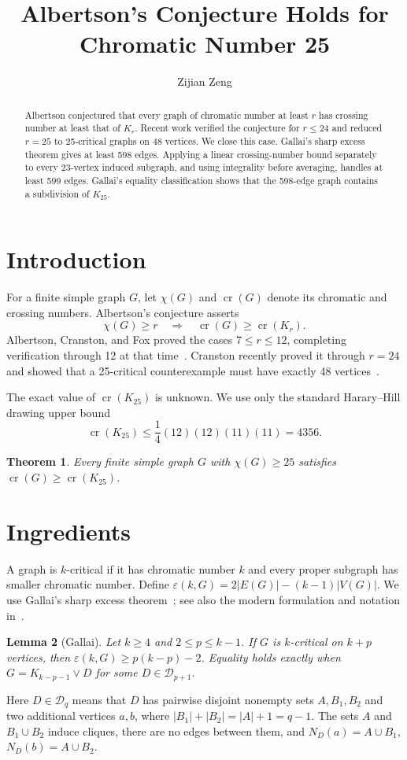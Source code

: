 \documentclass[11pt]{amsart}
\title{Albertson's Conjecture Holds for Chromatic Number 25}
\author{Zijian Zeng}
\date{}
\newtheorem{theorem}{Theorem}[section]
\newtheorem{lemma}[theorem]{Lemma}
\newcommand{\crn}{\operatorname{cr}}
\newcommand{\join}{\mathbin{\vee}}
\begin{document}
\begin{abstract}
Albertson conjectured that every graph of chromatic number at least $r$ has
crossing number at least that of $K_r$. Recent work verified the conjecture
for $r\leq24$ and reduced $r=25$ to 25-critical graphs on 48 vertices. We
close this case. Gallai's sharp excess theorem gives at least 598 edges.
Applying a linear crossing-number bound separately to every 23-vertex induced
subgraph, and using integrality before averaging, handles at least 599 edges.
Gallai's equality classification shows that the 598-edge graph contains a
subdivision of $K_{25}$.
\end{abstract}
\maketitle

\section{Introduction}
For a finite simple graph $G$, let $\chi(G)$ and $\crn(G)$ denote its chromatic
and crossing numbers. Albertson's conjecture asserts
\[
 \chi(G)\geq r\quad\Longrightarrow\quad\crn(G)\geq\crn(K_r).
\]
Albertson, Cranston, and Fox proved the cases $7\leq r\leq12$, completing
verification through 12 at that time~\cite{Albertson_Cranston_Fox_2009}.
Cranston recently proved it
through $r=24$ and showed that a 25-critical counterexample must have exactly
48 vertices~\cite{cranston2025progressalbertsonsconjecture}.

The exact value of $\crn(K_{25})$ is unknown. We use only the standard
Harary--Hill drawing upper bound
\begin{equation}\label{eq:hill}
 \crn(K_{25})\leq\frac14(12)(12)(11)(11)=4356.
\end{equation}
\begin{theorem}\label{thm:main}
Every finite simple graph $G$ with $\chi(G)\geq25$ satisfies
$\crn(G)\geq\crn(K_{25})$.
\end{theorem}

\section{Ingredients}
A graph is $k$-critical if it has chromatic number $k$ and every proper
subgraph has smaller chromatic number. Define
$\varepsilon(k,G)=2|E(G)|-(k-1)|V(G)|$. We use Gallai's sharp excess
theorem~\cite[pp.~374, 389--394]{Gallai1963}; see also the modern
formulation and notation in~\cite[Theorem~6]{Kostochka2006}.
\begin{lemma}[Gallai]\label{lem:gallai}
Let $k\geq4$ and $2\leq p\leq k-1$. If $G$ is $k$-critical on $k+p$
vertices, then $\varepsilon(k,G)\geq p(k-p)-2$. Equality holds exactly when
$G=K_{k-p-1}\join D$ for some $D\in\mathcal D_{p+1}$.
\end{lemma}
Here $D\in\mathcal D_q$ means that $D$ has pairwise disjoint nonempty sets
$A,B_1,B_2$ and two additional vertices $a,b$, where
$|B_1|+|B_2|=|A|+1=q-1$. The sets $A$ and $B_1\cup B_2$ induce cliques,
there are no edges between them, and
$N_D(a)=A\cup B_1$, $N_D(b)=A\cup B_2$.
\end{document}
